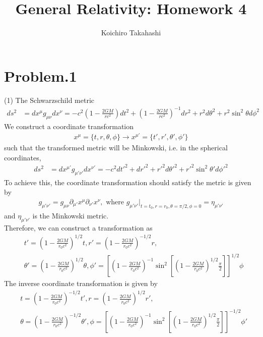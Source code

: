 \documentclass[12pt]{article}
\begin{document}
\title{General Relativity: Homework 4}
\author{Koichiro Takahashi}
\maketitle

\section*{Problem.1}
(1)
The Schwarzschild metric
\begin{align}
ds^2 &= dx^{\mu} g_{\mu \nu} dx^{\nu} = -c^2 \left(1 - \frac{2 G M}{r c^2} \right) dt^2 + \left(1 - \frac{2 G M}{r c^2} \right)^{-1} dr^2 + r^2 d\theta^2 + r^2 \sin^2{\theta} d\phi^2
\end{align}
We construct a coordinate transformation
\begin{align}
x^{\mu} = \{t, r, \theta, \phi \} \rightarrow x^{\mu'} = \{t', r', \theta', \phi'\}
\end{align}
such that the transformed metric will be Minkowski, i.e. in the spherical coordinates,
\begin{align}
ds^2 &= dx^{\mu'} g_{\mu' \nu'} dx^{\nu'} = -c^2 dt'^2 + dr'^2 + r'^2 d\theta'^2 + r'^2 \sin^2{\theta'} d\phi'^2 \label{Minkowski_obs}
\end{align}
To achieve this, the coordinate transformation should satisfy the metric is given by
\begin{align*}
g_{\mu' \nu'} = g_{\mu \nu} \partial_{\mu'} x^{\mu} \partial_{\nu'} x^{\nu}, \text{ where } g_{\mu' \nu'}\big|_{t = t_0, r = r_0, \theta = \pi/2, \phi = 0} = \eta_{\mu' \nu'}
\end{align*}
and $\eta_{\mu' \nu'}$ is the Minkowski metric.\\
Therefore, we can construct a transformation as
\begin{align*}
&t' =  \left(1 - \frac{2 G M}{r_0 c^2} \right)^{1/2} t, r' =  \left(1 - \frac{2 G M}{r_0 c^2} \right)^{-1/2} r,\\[1em]
&\theta' =  \left(1 - \frac{2 G M}{r_0 c^2} \right)^{1/2} \theta, \phi' = \left[\left(1 - \frac{2 G M}{r_0 c^2} \right)^{-1} \sin^2\left[\left(1 - \frac{2 G M}{r_0 c^2} \right)^{1/2} \frac{\pi}{2} \right]\right]^{1/2} \phi
\end{align*}
The inverse coordinate transformation is given by
\begin{align*}
&t =  \left(1 - \frac{2 G M}{r_0 c^2} \right)^{- 1/2} t', r =  \left(1 - \frac{2 G M}{r_0 c^2} \right)^{1/2} r',\\[1em]
&\theta =  \left(1 - \frac{2 G M}{r_0 c^2} \right)^{- 1/2} \theta', \phi = \left[\left(1 - \frac{2 G M}{r_0 c^2} \right)^{-1} \sin^2\left[\left(1 - \frac{2 G M}{r_0 c^2} \right)^{1/2} \frac{\pi}{2} \right]\right]^{- 1/2} \phi'
\end{align*}
\end{document}
